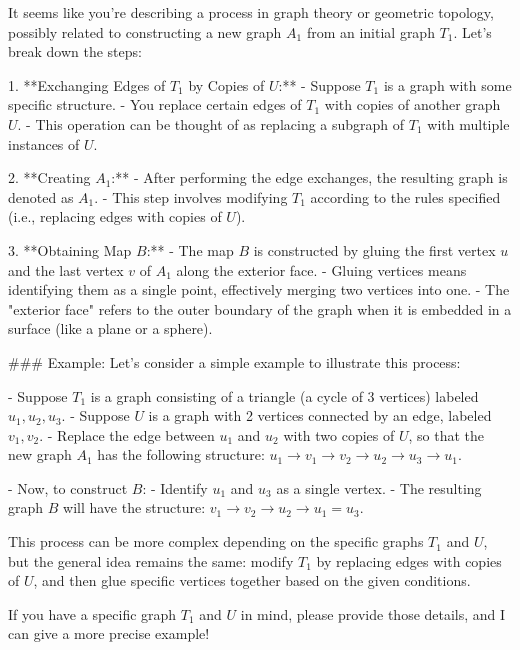 It seems like you're describing a process in graph theory or geometric topology, possibly related to constructing a new graph \(A_1\) from an initial graph \(T_1\). Let's break down the steps:

1. **Exchanging Edges of \(T_1\) by Copies of \(U\):**
   - Suppose \(T_1\) is a graph with some specific structure.
   - You replace certain edges of \(T_1\) with copies of another graph \(U\).
   - This operation can be thought of as replacing a subgraph of \(T_1\) with multiple instances of \(U\).

2. **Creating \(A_1\):**
   - After performing the edge exchanges, the resulting graph is denoted as \(A_1\).
   - This step involves modifying \(T_1\) according to the rules specified (i.e., replacing edges with copies of \(U\)).

3. **Obtaining Map \(B\):**
   - The map \(B\) is constructed by gluing the first vertex \(u\) and the last vertex \(v\) of \(A_1\) along the exterior face.
   - Gluing vertices means identifying them as a single point, effectively merging two vertices into one.
   - The "exterior face" refers to the outer boundary of the graph when it is embedded in a surface (like a plane or a sphere).

### Example:
Let's consider a simple example to illustrate this process:

- Suppose \(T_1\) is a graph consisting of a triangle (a cycle of 3 vertices) labeled \(u_1, u_2, u_3\).
- Suppose \(U\) is a graph with 2 vertices connected by an edge, labeled \(v_1, v_2\).
- Replace the edge between \(u_1\) and \(u_2\) with two copies of \(U\), so that the new graph \(A_1\) has the following structure: \(u_1 \to v_1 \to v_2 \to u_2 \to u_3 \to u_1\).

- Now, to construct \(B\):
  - Identify \(u_1\) and \(u_3\) as a single vertex.
  - The resulting graph \(B\) will have the structure: \(v_1 \to v_2 \to u_2 \to u_1 = u_3\).

This process can be more complex depending on the specific graphs \(T_1\) and \(U\), but the general idea remains the same: modify \(T_1\) by replacing edges with copies of \(U\), and then glue specific vertices together based on the given conditions.

If you have a specific graph \(T_1\) and \(U\) in mind, please provide those details, and I can give a more precise example!